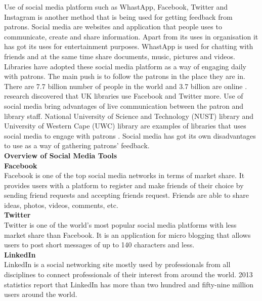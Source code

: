 \documentclass[12pt]{report}
\begin{document}
	Use of social media platform such as WhastApp, Facebook, Twitter and Instagram is another method that is being used for getting feedback from patrons. Social media are websites and application that people uses to communicate, create and share information. Apart from its uses in organisation it has got its uses for entertainment purposes. WhastApp is used for chatting with friends and at the same time share documents, music, pictures and videos. Libraries have adopted these social media platform as a way of engaging daily with patrons. The main push is to follow the patrons in the place they are in. There are 7.7 billion number of people in the world and 3.7 billion are online \citep{ortiz2019rise}.  \cite{mabweazara2016assessing} research discovered that UK libraries use Facebook and Twitter more. Use of social media bring advantages of live communication between the patron and library staff. National University of Science and Technology (NUST) library and University of Western Cape (UWC) library are examples of libraries that uses social media to engage with patrons \citep{mabweazara2016assessing}. Social media has got its own disadvantages to use as a way of gathering patrons’ feedback.\\
	
	\textbf{Overview of Social Media Tools}\\
	
	\textbf{Facebook}\\
	Facebook is one of the top social media networks in terms of market share. It provides users with a platform to register and make friends of their choice by sending friend requests and accepting friends request. Friends are able to share ideas, photos, videos, comments, etc.\\
	
	\textbf{Twitter}\\ 
	Twitter is one of the world's most popular social media platforms with less market share than Facebook. It is an application for micro blogging that allows users to post short messages of up to 140 characters and less.\\
	
	\textbf{LinkedIn}\\
	LinkedIn is a social networking site mostly used by professionals from all disciplines to connect professionals of their interest from around the world. 2013 statistics report that LinkedIn has more than two hundred and fifty-nine million users around the world.\\
	
\end{document}
